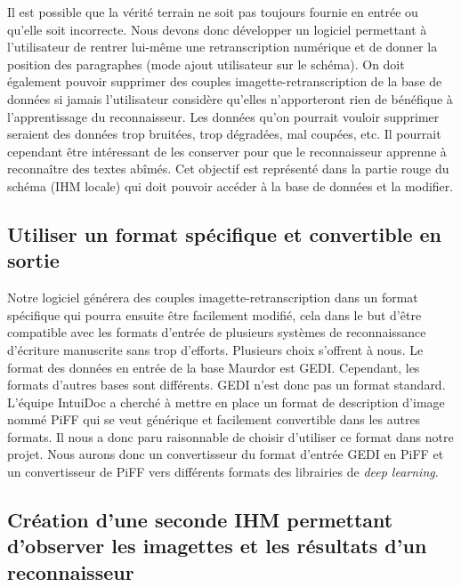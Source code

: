 Il est possible que la vérité terrain ne soit pas toujours fournie en entrée ou qu’elle soit incorrecte.
Nous devons donc développer un logiciel permettant à l’utilisateur de rentrer lui-même une retranscription
numérique et de donner la position des paragraphes (mode ajout utilisateur sur le schéma). On doit également
pouvoir supprimer des couples imagette-retranscription de la base de données si jamais l’utilisateur considère
qu’elles n’apporteront rien de bénéfique à l’apprentissage du reconnaisseur. Les données qu’on pourrait vouloir
supprimer seraient des données trop bruitées, trop dégradées, mal coupées, etc. Il pourrait cependant être
intéressant de les conserver pour que le reconnaisseur apprenne à reconnaître des textes abîmés. Cet objectif
est représenté dans la partie rouge du schéma (IHM locale) qui doit pouvoir accéder à la base de données
et la modifier.

\subsection{Utiliser un format spécifique et convertible en sortie}

Notre logiciel générera des couples imagette-retranscription dans un format spécifique qui pourra ensuite être
facilement modifié, cela dans le but d’être compatible avec les formats d’entrée de plusieurs systèmes de
reconnaissance d’écriture manuscrite sans trop d’efforts. Plusieurs choix s’offrent à nous. Le format des données
en entrée de la base Maurdor est GEDI. Cependant, les formats d’autres bases sont différents. GEDI n’est donc pas
un format standard. L’équipe IntuiDoc a cherché à mettre en place un format de description d’image nommé PiFF qui
se veut générique et facilement convertible dans les autres formats. Il nous a donc paru raisonnable de choisir
d’utiliser ce format dans notre projet. Nous aurons donc un convertisseur du format d’entrée GEDI en PiFF et un
convertisseur de PiFF vers différents formats des librairies de \textit{deep learning}.

\subsection{Création d'une seconde IHM permettant d'observer les imagettes et les résultats d'un reconnaisseur}

